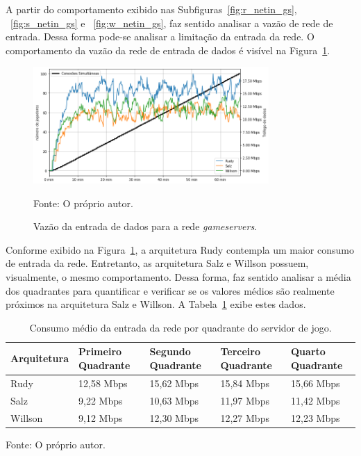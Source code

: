 A partir do comportamento exibido nas Subfiguras~\ref{fig:r_netin_gs}, ~\ref{fig:s_netin_gs} e ~\ref{fig:w_netin_gs}, faz sentido analisar a vazão de rede de entrada.
%
Dessa forma pode-se analisar a limitação da entrada da rede.
%
O comportamento da vazão da rede de entrada de dados é visível na Figura~\ref{fig:net_in_gs}.

\begin{figure}[htb!]
  \caption{Vazão da entrada de dados para a rede \textit{gameservers}.}
  \label{fig:net_in_gs}
  \includegraphics[width=0.8\textwidth]{figuras/analise/net_in_gs.png}
  \centering

  Fonte: O próprio autor.
\end{figure}

Conforme exibido na Figura~\ref{fig:net_in_gs}, a arquitetura Rudy contempla um maior consumo de entrada da rede.
%
Entretanto, as arquitetura Salz e Willson possuem, visualmente, o mesmo comportamento.
%
Dessa forma, faz sentido analisar a média dos quadrantes para quantificar e verificar se os valores médios são realmente próximos na arquitetura Salz e Willson.
%
A Tabela~\ref{tab:net_in_gs_media_quadrantes} exibe estes dados.

\begin{table}[htb!]
\centering
\begin{adjustbox}{max width=\textwidth}
\caption{Consumo médio da entrada da rede por quadrante do servidor de jogo.}
\label{tab:net_in_gs_media_quadrantes}

\begin{tabular}{l|l|l|l|l}
\hline \hline
Arquitetura & Primeiro Quadrante & Segundo Quadrante & Terceiro Quadrante & Quarto Quadrante \\ \hline \hline
Rudy        & 12,58 Mbps            & 15,62 Mbps           & 15,84 Mbps            & 15,66 Mbps          \\ \hline
Salz        & 9,22 Mbps            & 10,63 Mbps           & 11,97 Mbps            & 11,42 Mbps          \\ \hline
Willson     & 9,12 Mbps            & 12,30 Mbps          & 12,27 Mbps            & 12,23 Mbps          \\ \hline \hline
\end{tabular}
\end{adjustbox}

Fonte: O próprio autor.
\end{table}

